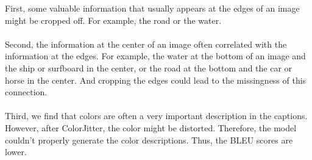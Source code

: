 \documentclass{article}
\begin{document}
    First, some valuable information that usually appears at the edges of an image might be cropped off. For example, the road or the water. \\ \\
    Second, the information at the center of an image often correlated with the information at the edges. For example, the water at the bottom of an image and the ship or surfboard in the center, or the road at the bottom and the car or horse in the center. And cropping the edges could lead to the missingness of this connection. \\ \\
    Third, we find that colors are often a very important description in the captions. However, after ColorJitter, the color might be distorted. Therefore, the model couldn't properly generate the color descriptions. Thus, the BLEU scores are lower.
\end{document}

